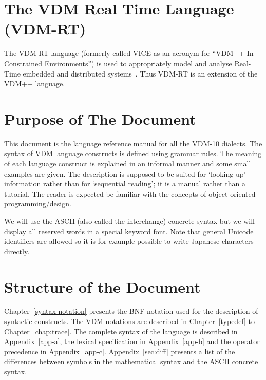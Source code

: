 \documentclass{overturerepchap}
\begin{document}
\section{The VDM Real Time Language (VDM-RT)}

The VDM-RT language (formerly called VICE as an acronym for ``VDM++ In
Constrained Environments'') is used to appropriately model and analyse
Real-Time embedded and distributed
systems~\cite{Mukherjee&00,Verhoef&06b,Verhoef&07,Verhoef08,Larsen&09b}. Thus
VDM-RT is an extension of the VDM++ language.


\section{Purpose of The Document}

This document is the language reference manual for all the VDM-10 dialects.  The
syntax of VDM language constructs is defined using grammar rules.
The meaning of each language construct is explained in an informal
manner and some small examples are given. The description is supposed
to be suited for `looking up' information rather than for `sequential
reading'; it is a manual rather than a tutorial.  The reader is
expected be familiar with the concepts of object oriented
programming/design.

We will use the ASCII (also called the interchange)
concrete syntax but we will display all reserved words in a special
keyword font. Note that general Unicode identifiers are allowed so
it is for example possible to write Japanese characters directly.

\section{Structure of the Document}

Chapter~\ref{syntax-notation} presents the BNF notation used for the
description of syntactic constructs.  The VDM notations are described
in Chapter~\ref{typedef} to Chapter~\ref{chap:trace}.
The complete syntax of the language is described in
Appendix~\ref{app-a}, the lexical specification in
Appendix~\ref{app-b} and the operator precedence in
Appendix~\ref{app-c}. Appendix~\ref{sec:diff} presents a list of the
differences between symbols in the mathematical syntax and the ASCII
concrete syntax.
\end{document}
